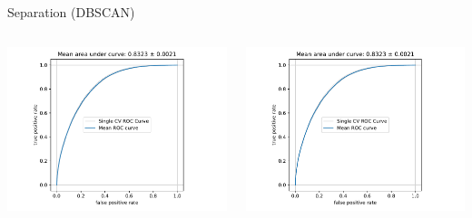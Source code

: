 \begin{frame}[t]{Separation (DBSCAN)}
\begin{columns}[onlytextwidth]
\begin{column}{0.475\textwidth}
  \centering
  \includegraphics[width=1.1\textwidth, page=1]{fig/separation_performance_DBSCAN.pdf}
\end{column}
\hfill%
\begin{column}{0.475\textwidth}
    \centering
    \includegraphics[width=\textwidth, page=2]{fig/separation_performance_DBSCAN.pdf}
\end{column}
\end{columns}
\end{frame}

